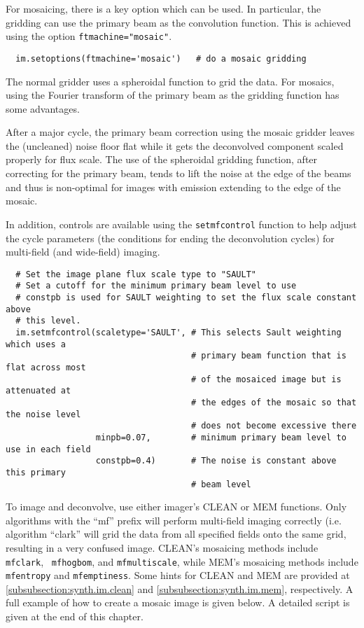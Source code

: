 For mosaicing, there is a key option which can be used. In particular,
the gridding can use the primary beam as the convolution function. This
is achieved using the option {\tt ftmachine="mosaic"}.

\small
\begin{verbatim}
  im.setoptions(ftmachine='mosaic')   # do a mosaic gridding
\end{verbatim}
\normalsize

The normal gridder uses a spheroidal function to grid the data. For
mosaics, using the Fourier transform of the primary beam as the
gridding function has some advantages.

After a major cycle, the primary beam correction using the mosaic
gridder leaves the (uncleaned) noise floor flat while it gets the
deconvolved component scaled properly for flux scale. The use of the
spheroidal gridding function, after correcting for the primary beam,
tends to lift the noise at the edge of the beams and thus is
non-optimal for images with emission extending to the edge of the
mosaic.

In addition, controls are available using the {\tt setmfcontrol}
function to help adjust the cycle parameters (the conditions for
ending the deconvolution cycles) for multi-field (and wide-field)
imaging.

\small
\begin{verbatim}
  # Set the image plane flux scale type to "SAULT"
  # Set a cutoff for the minimum primary beam level to use
  # constpb is used for SAULT weighting to set the flux scale constant above
  # this level.
  im.setmfcontrol(scaletype='SAULT', # This selects Sault weighting which uses a
                                     # primary beam function that is flat across most
                                     # of the mosaiced image but is attenuated at
                                     # the edges of the mosaic so that the noise level
                                     # does not become excessive there
                  minpb=0.07,        # minimum primary beam level to use in each field
                  constpb=0.4)       # The noise is constant above this primary
                                     # beam level
\end{verbatim}
\normalsize

\vspace{3mm}

To image and deconvolve, use either imager's CLEAN or MEM functions.
Only algorithms with the ``mf'' prefix will perform multi-field
imaging correctly (i.e. algorithm ``clark'' will grid the data from
all specified fields onto the same grid, resulting in a very confused
image.  CLEAN's mosaicing methods include {\tt mfclark}, {\tt
mfhogbom}, and {\tt mfmultiscale}, while MEM's mosaicing methods
include {\tt mfentropy} and {\tt mfemptiness}.  Some hints for CLEAN
and MEM are provided at \ref{subsubsection:synth.im.clean} and
\ref{subsubsection:synth.im.mem}, respectively.  A full example of how
to create a mosaic image is given below. A detailed script is given at
the end of this chapter.

